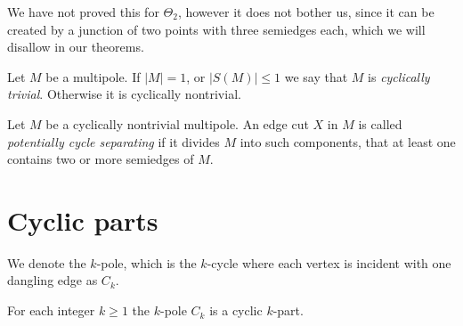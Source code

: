 \documentclass[12pt, twoside]{book}
\begin{document}
We have not proved this for $\Theta_2$, however it does not bother us, since it can be created by a junction of two points with three semiedges each, which we will disallow in our theorems.

\begin{definition}
	Let $M$ be a multipole. If $|M|=1$, or $|S(M)|\leq 1$ we say that $M$ is \textit{cyclically trivial}. Otherwise it is cyclically nontrivial. 
\end{definition}

\begin{definition}
	Let $M$ be a cyclically nontrivial multipole. An edge cut $X$ in $M$ is called \textit{potentially cycle separating} if it divides $M$ into such components, that at least one contains two or more semiedges of $M$.
\end{definition}

\section{Cyclic parts}\label{sec:cyclic-part-results}

We denote the $k$-pole, which is the $k$-cycle where each vertex is incident with one dangling edge as $C_k$.

\begin{lemma}\label{lem:each-cycle-cyclic-part}
	For each integer $k\geq 1$ the $k$-pole $C_k$ is a cyclic $k$-part. 
\end{lemma}
\end{document}
